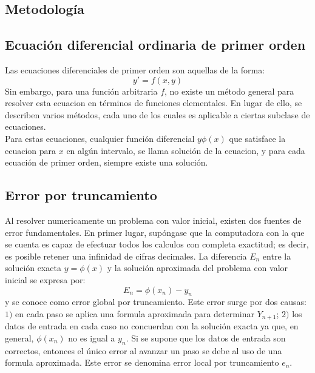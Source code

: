 \documentclass[10pt]{article}
\begin{document}
\begin{multicols}{2}
		\section{Metodología}
			\subsection{Ecuación diferencial ordinaria de primer orden}
				Las ecuaciones diferenciales de primer orden son aquellas de la forma:
				$$y'=f(x,y)$$
				Sin embargo, para una función arbitraria $f$, no existe un método general para resolver esta ecuacion en términos de funciones elementales. En lugar de ello, se describen varios métodos, cada uno de los cuales es aplicable a ciertas subclase de ecuaciones.\\
				Para estas ecuaciones, cualquier función diferencial $y\phi(x)$ que satisface la ecuacion para $x$ en algún intervalo, se llama solución de la ecuacion, y para cada ecuación de primer orden, siempre existe una solución.
			\subsection{Error por truncamiento}
				Al resolver numericamente un problema con valor inicial, existen dos fuentes de error fundamentales. En primer lugar, supóngase que la computadora con la que se cuenta es capaz de efectuar todos los calculos con completa exactitud; es decir, es posible retener una infinidad de cifras decimales. La diferencia $E_n$ entre la solución exacta $y=\phi(x)$ y la solución aproximada del problema con valor inicial se expresa por:
				$$E_n=\phi(x_n)-y_n$$
				y se conoce como error global por truncamiento. Este error surge por dos causas: $1)$ en cada paso se aplica una formula aproximada para determinar $Y_{n+1}$; $2)$ los datos de entrada en cada caso no concuerdan con la solución exacta ya que, en general, $\phi(x_n)$ no es igual a $y_n$. Si se supone que los datos de entrada son correctos, entonces el único error al avanzar un paso se debe al uso de una formula aproximada. Este error se denomina error local por truncamiento $e_n$. 

\end{multicols}
\end{document}
